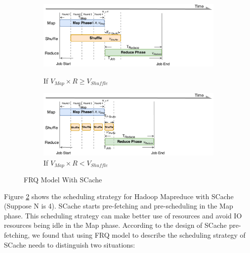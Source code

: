 {\begin{figure}
	\centering
	\begin{minipage}[hb]{\linewidth}
		\begin{subfigure}{\linewidth}
			\begin{minipage}{\linewidth}
				\includegraphics[width=\linewidth]{fig/model_scache1}
				\caption{\color{blue}If \(V_{Map} \times R \ge V_{Shuffle}\)}
				\label{fig:model_scache1}
			\end{minipage}
			\begin{minipage}{\linewidth}
				\includegraphics[width=\linewidth]{fig/model_scache2}
				\caption{\color{blue}If \(V_{Map} \times R < V_{Shuffle}\)}
				\label{fig:model_scache2}
			\end{minipage}
		\end{subfigure}
		\caption{\color{blue}FRQ Model With SCache}
		\label{fig:model_scache}
	\end{minipage}
\end{figure}

Figure \ref{fig:model_scache} shows the scheduling strategy for Hadoop Mapreduce with SCache (Suppose N is 4). SCache starts pre-fetching and pre-scheduling in the Map phase. This scheduling strategy can make better use of resources and avoid IO resources being idle in the Map phase. According to the design of SCache pre-fetching, we found that using FRQ model to describe the scheduling strategy of SCache needs to distinguish two situations:

}
